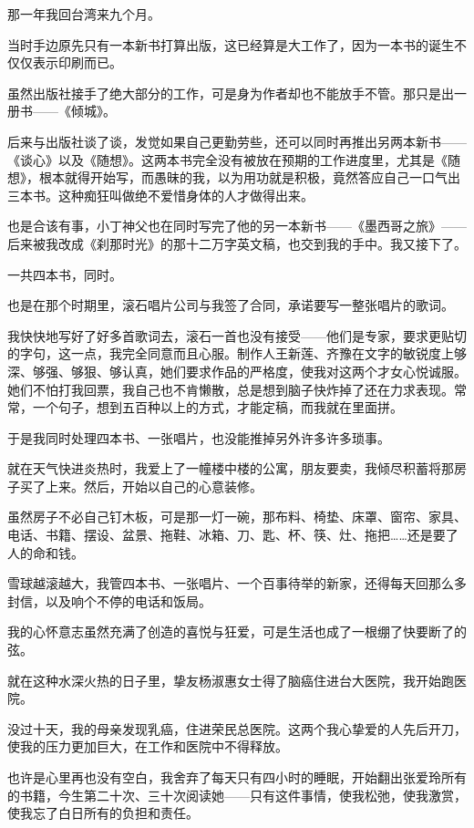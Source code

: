 \par 那一年我回台湾来九个月。
\par 当时手边原先只有一本新书打算出版，这已经算是大工作了，因为一本书的诞生不仅仅表示印刷而已。
\par 虽然出版社接手了绝大部分的工作，可是身为作者却也不能放手不管。那只是出一册书——《倾城》。
\par 后来与出版社谈了谈，发觉如果自己更勤劳些，还可以同时再推出另两本新书——《谈心》以及《随想》。这两本书完全没有被放在预期的工作进度里，尤其是《随想》，根本就得开始写，而愚昧的我，以为用功就是积极，竟然答应自己一口气出三本书。这种痴狂叫做绝不爱惜身体的人才做得出来。
\par 也是合该有事，小丁神父也在同时写完了他的另一本新书——《墨西哥之旅》——后来被我改成《刹那时光》的那十二万字英文稿，也交到我的手中。我又接下了。
\par 一共四本书，同时。
\par 也是在那个时期里，滚石唱片公司与我签了合同，承诺要写一整张唱片的歌词。
\par 我快快地写好了好多首歌词去，滚石一首也没有接受——他们是专家，要求更贴切的字句，这一点，我完全同意而且心服。制作人王新莲、齐豫在文字的敏锐度上够深、够强、够狠、够认真，她们要求作品的严格度，使我对这两个才女心悦诚服。她们不怕打我回票，我自己也不肯懒散，总是想到脑子快炸掉了还在力求表现。常常，一个句子，想到五百种以上的方式，才能定稿，而我就在里面拼。
\par 于是我同时处理四本书、一张唱片，也没能推掉另外许多许多琐事。
\par 就在天气快进炎热时，我爱上了一幢楼中楼的公寓，朋友要卖，我倾尽积蓄将那房子买了上来。然后，开始以自己的心意装修。
\par 虽然房子不必自己钉木板，可是那一灯一碗，那布料、椅垫、床罩、窗帘、家具、电话、书籍、摆设、盆景、拖鞋、冰箱、刀、匙、杯、筷、灶、拖把……还是要了人的命和钱。
\par 雪球越滚越大，我管四本书、一张唱片、一个百事待举的新家，还得每天回那么多封信，以及响个不停的电话和饭局。
\par 我的心怀意志虽然充满了创造的喜悦与狂爱，可是生活也成了一根绷了快要断了的弦。
\par 就在这种水深火热的日子里，挚友杨淑惠女士得了脑癌住进台大医院，我开始跑医院。
\par 没过十天，我的母亲发现乳癌，住进荣民总医院。这两个我心挚爱的人先后开刀，使我的压力更加巨大，在工作和医院中不得释放。
\par 也许是心里再也没有空白，我舍弃了每天只有四小时的睡眠，开始翻出张爱玲所有的书籍，今生第二十次、三十次阅读她——只有这件事情，使我松弛，使我激赏，使我忘了白日所有的负担和责任。

